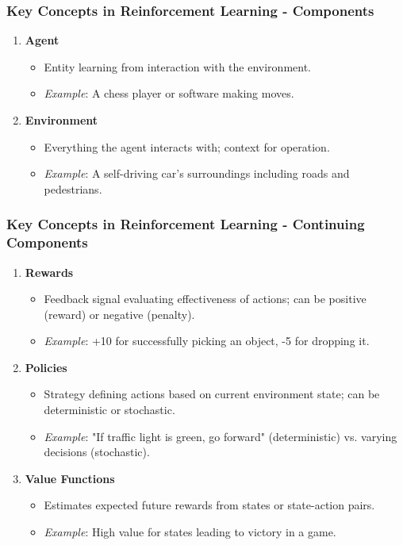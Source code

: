 \documentclass{beamer}
\begin{document}
\begin{frame}[fragile]
    \frametitle{Key Concepts in Reinforcement Learning - Components}
    \begin{enumerate}
        \item \textbf{Agent}
            \begin{itemize}
                \item Entity learning from interaction with the environment.
                \item \textit{Example}: A chess player or software making moves.
            \end{itemize}
        \item \textbf{Environment}
            \begin{itemize}
                \item Everything the agent interacts with; context for operation.
                \item \textit{Example}: A self-driving car's surroundings including roads and pedestrians.
            \end{itemize}
    \end{enumerate}
\end{frame}

\begin{frame}[fragile]
    \frametitle{Key Concepts in Reinforcement Learning - Continuing Components}
    \begin{enumerate}[resume]
        \item \textbf{Rewards}
            \begin{itemize}
                \item Feedback signal evaluating effectiveness of actions; can be positive (reward) or negative (penalty).
                \item \textit{Example}: +10 for successfully picking an object, -5 for dropping it.
            \end{itemize}
        \item \textbf{Policies}
            \begin{itemize}
                \item Strategy defining actions based on current environment state; can be deterministic or stochastic.
                \item \textit{Example}: "If traffic light is green, go forward" (deterministic) vs. varying decisions (stochastic).
            \end{itemize}
        \item \textbf{Value Functions}
            \begin{itemize}
                \item Estimates expected future rewards from states or state-action pairs.
                \item \textit{Example}: High value for states leading to victory in a game.
            \end{itemize}
    \end{enumerate}
\end{frame}
\end{document}
